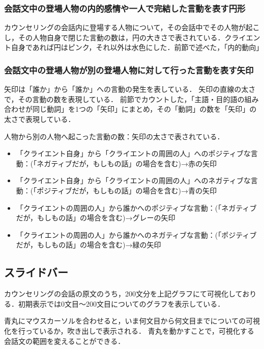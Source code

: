 \documentclass[shuuron]{kuee}
\begin{document}
\subsubsection{会話文中の登場人物の内的感情や一人で完結した言動を表す円形}

カウンセリングの会話内に登場する人物について，その会話中でその人物が起こし，その人物自身で閉じた言動の数は，円の大きさで表されている．クライエント自身であれば円はピンク，それ以外は水色にした．前節で述べた，「内的動向」


\subsubsection{会話文中の登場人物が別の登場人物に対して行った言動を表す矢印}

矢印は「誰か」から「誰か」への言動の発生を表している．
矢印の直線の太さで，その言動の数を表現している．
前節でカウントした，「主語・目的語の組み合わせが同じ動詞」を1つの「矢印」にまとめ，その「動詞」の数を「矢印」の太さで表現している．

人物から別の人物へ起こった言動の数：矢印の太さで表されている．


\begin{itemize}
  \item 「クライエント自身」から「クライエントの周囲の人」へのポジティブな言動：(「ネガティブだが，もしもの話」の場合を含む)→赤の矢印
  \item 「クライエント自身」から「クライエントの周囲の人」へのネガティブな言動：(「ポジティブだが，もしもの話」の場合を含む)→青の矢印
  \item 「クライエントの周囲の人」から誰かへのポジティブな言動：(「ネガティブだが，もしもの話」の場合を含む)→グレーの矢印
  \item 「クライエントの周囲の人」から誰かへのネガティブな言動：(「ポジティブだが，もしもの話」の場合を含む)→緑の矢印
\end{itemize}








\subsection{スライドバー}

カウンセリングの会話の原文のうち，200文分を上記グラフにて可視化しておりる．初期表示では0文目〜200文目についてのグラフを表示している．

青丸にマウスカーソルを合わせると，いま何文目から何文目までについての可視化を行っているか，吹き出しで表示される．
青丸を動かすことで，可視化する会話文の範囲を変えることができる．
\end{document}
